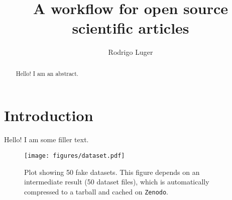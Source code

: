 \documentclass[twocolumn]{aastex631}
\begin{document}
\title{A workflow for open source scientific articles}

\author[0000-0002-0296-3826]{Rodrigo Luger}

\begin{abstract}
    Hello! I am an abstract.
\end{abstract}

\section{Introduction}
\label{sec:intro}

Hello! I am some filler text.

\begin{figure}[ht!]
    \begin{centering}
        \texttt{[image: figures/dataset.pdf]}
        \caption{
            Plot showing 50 fake datasets.
            This figure depends on an intermediate result (50 dataset files), which is automatically compressed to a tarball and cached on \texttt{Zenodo}.
        }
        \label{fig:plot_dataset}
    \end{centering}
\end{figure}
\end{document}
